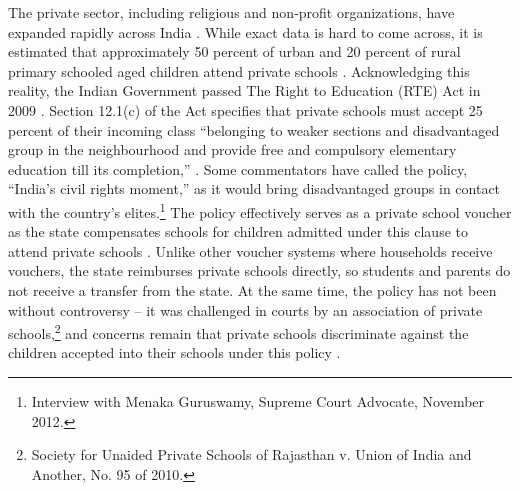 \documentclass[hidelinks, 12pt, titlepage]{article}
\begin{document}
	The private sector, including religious and non-profit organizations, have expanded rapidly across India \citep{Kingdon2017}.  While exact data is hard to come across, it is estimated that approximately 50 percent of urban and 20 percent of rural primary schooled aged children attend private schools \citep[6]{Kingdon2017}.  Acknowledging this reality, the Indian Government passed The Right to Education (RTE) Act in 2009 \citep{GovernmentofIndia2009}. Section 12.1(c) of the Act specifies that private schools must accept 25 percent of their incoming class ``belonging to weaker sections and disadvantaged group in the neighbourhood and provide free and compulsory elementary education till its completion,'' \citep[5-6]{GovernmentofIndia2009}.  Some commentators have called the policy, ``India's civil rights moment,'' as it would bring disadvantaged groups in contact with the country's elites.\footnote{Interview with Menaka Guruswamy, Supreme Court Advocate, November 2012.}  The policy effectively serves as a private school voucher as the state compensates schools for children admitted under this clause to attend private schools \citep[6]{GovernmentofIndia2009}.  Unlike other voucher systems where households receive vouchers, the state reimburses private schools directly, so students and parents do not receive a transfer from the state.  At the same time, the policy has not been without controversy -- it was challenged in courts by an association of private schools,\footnote{Society for Unaided Private Schools of Rajasthan v. Union of India and Another, No. 95 of 2010.} and concerns remain that private schools discriminate against the children accepted into their schools under this policy \citep{Romero2022}.
\end{document}
